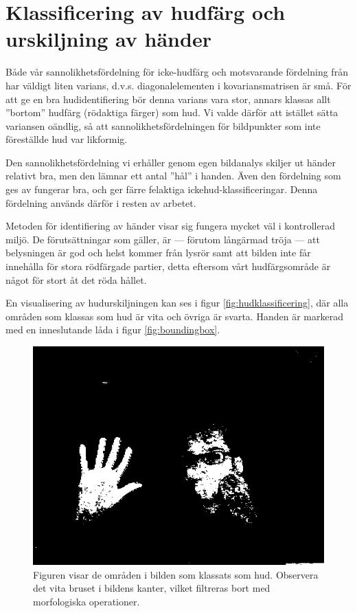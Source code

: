 \documentclass[../rapport_MVEX01-11-05]{subfiles}
\begin{document}
\section{Klassificering av hudfärg och urskiljning av händer}
Både vår sannolikhetsfördelning för icke-hudfärg och motsvarande
fördelning från  har väldigt liten varians,
d.v.s. diagonalelementen i kovariansmatrisen är små. För att ge en bra
hudidentifiering bör denna varians vara stor, annars klassas allt
''bortom'' hudfärg (rödaktiga färger) som hud. Vi valde därför att
istället sätta variansen oändlig, så att sannolikhetsfördelningen för
bildpunkter som inte föreställde hud var likformig.

Den sannolikhetsfördelning vi erhåller genom egen bildanalys skiljer
ut händer relativt bra, men den lämnar ett antal ''hål'' i handen. Även
den fördelning som ges av  fungerar bra, och
ger färre felaktiga ickehud-klassificeringar.
Denna fördelning används därför
i resten av arbetet. 

Metoden för identifiering av händer visar sig fungera mycket väl i
kontrollerad miljö. De förutsättningar som gäller, är --- förutom långärmad
tröja --- att belysningen är god och helst kommer från lysrör
samt att bilden inte får innehålla för stora rödfärgade partier, detta
eftersom vårt hudfärgsområde är något för stort åt det röda hållet. 

En visualisering av hudurskiljningen kan ses i figur
\vref{fig:hudklassificering}, där alla områden som klassas som hud
är vita och övriga är svarta. Handen är markerad med en inneslutande
låda i figur \vref{fig:boundingbox}.

\begin{figure}
  \centering
  \includegraphics[width=0.9\columnwidth]{bilder/whiteskin}
  \caption{Figuren visar de områden i bilden som klassats som hud.
  Observera det vita bruset i bildens kanter, vilket filtreras bort med
  morfologiska operationer.}
  \label{fig:hudklassificering}
\end{figure}
\end{document}
